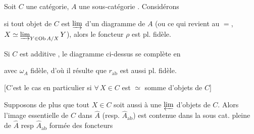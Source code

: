 
Soit $C$ une catégorie, $A$ une sous-catégorie  . Considérons 


si  tout objet  de $C$ est $\varinjlim$  d'un diagramme de $A$ (ou ce qui revient au $=$, $X\simeq\varinjlim_{Y\in\mathrm{Ob}\,A/X}Y$), alors le foncteur $\rho$ est pl. fidèle.

Si $C$ est additive , le diagramme ci-dessus se complète en



avec $\omega_A$ fidèle, d'où il résulte que $r_{\mathrm{ab}}$ est aussi pl. fidèle.

[C'est le cas en particulier si $\forall\,X\in C$ est $\simeq$ somme d'objets de $C$]

Supposons de plus que tout $X\in C$ soit aussi  à une $\varprojlim$  d'objets de $C$. Alors l'image essentielle de $C$ dans $\widehat A$ (resp. $\widehat A_{\mathrm{ab}}$) est contenue dans la sous cat. pleine de $\widehat A$ resp $\widehat A_{\mathrm{ab}}$ formée des foncteurs

